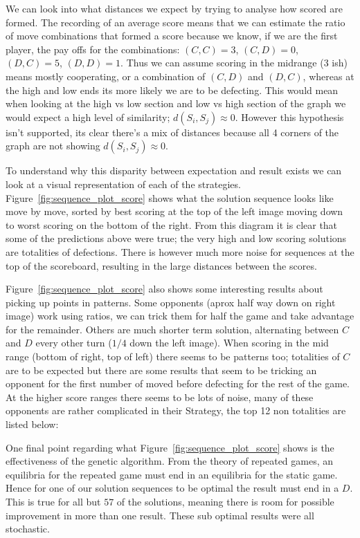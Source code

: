 We can look into what distances we expect by trying to analyse how scored are formed.
The recording of an average score means that we can estimate the ratio of move combinations that formed a score because we know, if we are the first player, the pay offs for the combinations: $(C,C)=3$, $(C,D)=0$, $(D,C)=5$, $(D,D)=1$.
Thus we can assume scoring in the midrange ($3$ ish) means mostly cooperating, or a combination of $(C,D)$ and $(D,C)$, whereas at the high and low ends its more likely we are to be defecting.
This would mean when looking at the high vs low section and low vs high section of the graph we would expect a high level of similarity; $d(S_i,S_j)\approx 0$.
However this hypothesis isn't supported, its clear there's a mix of distances because all 4 corners of the graph are not showing $d(S_i,S_j)\approx 0$. 

To understand why this disparity between expectation and result exists we can look at a visual representation of each of the strategies.
Figure~\ref{fig:sequence_plot_score} shows what the solution sequence looks like move by move, sorted by best scoring at the top of the left image moving down to worst scoring on the bottom of the right.
From this diagram it is clear that some of the predictions above were true; the very high and low scoring solutions are totalities of defections.
There is however much more noise for sequences at the top of the scoreboard, resulting in the large distances between the scores.

Figure~\ref{fig:sequence_plot_score} also shows some interesting results about picking up points in patterns.
Some opponents (aprox half way down on right image) work using ratios, we can trick them for half the game and take advantage for the remainder.
Others are much shorter term solution, alternating between $C$ and $D$ every other turn ($1/4$ down the left image).
When scoring in the mid range (bottom of right, top of left) there seems to be patterns too; totalities of $C$ are to be expected but there are some results that seem to be tricking an opponent for the first number of moved before defecting for the rest of the game.
At the higher score ranges there seems to be lots of noise, many of these opponents are rather complicated in their Strategy, the top 12 non totalities are listed below:

One final point regarding what Figure~\ref{fig:sequence_plot_score} shows is the effectiveness of the genetic algorithm.
From the theory of repeated games, an equilibria for the repeated game must end in an equilibria for the static game.
Hence for one of our solution sequences to be optimal the result must end in a $D$. 
This is true for all but $57$ of the solutions, meaning there is room for possible improvement in more than one result.
These sub optimal results were all stochastic.

